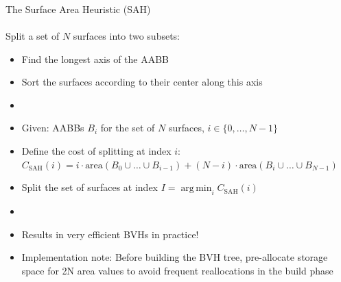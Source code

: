 \documentclass[utf8,stillsansserifmath,fleqn,t]{beamer}
\DeclareMathOperator*{\argmin}{arg\,min}
\begin{document}
\begin{frame}
\frametitle{\insertsection}
The Surface Area Heuristic (SAH)\\~\\
Split a set of $N$ surfaces into two subsets:
\begin{itemize}
\item Find the longest axis of the AABB
\item Sort the surfaces according to their center along this axis
\item[~] ~    
\item Given: AABBs $B_i$ for the set of $N$ surfaces, $i\in \{0, \ldots, N-1\}$
\item Define the cost of splitting at index $i$:\\
    $C_{\text{SAH}}(i) = i\cdot\text{area}(B_0 \cup \ldots \cup B_{i-1}) +
    (N-i)\cdot\text{area}(B_i\cup\ldots\cup B_{N-1})$
\item Split the set of surfaces at index $I = \argmin_i C_{\text{SAH}}(i)$
\item[~] ~
\item Results in very efficient BVHs in practice!
\item Implementation note: 
    Before building the BVH tree, pre-allocate storage space for 2N area
    values to avoid frequent reallocations in the build phase
\end{itemize}
\end{frame}
\end{document}
